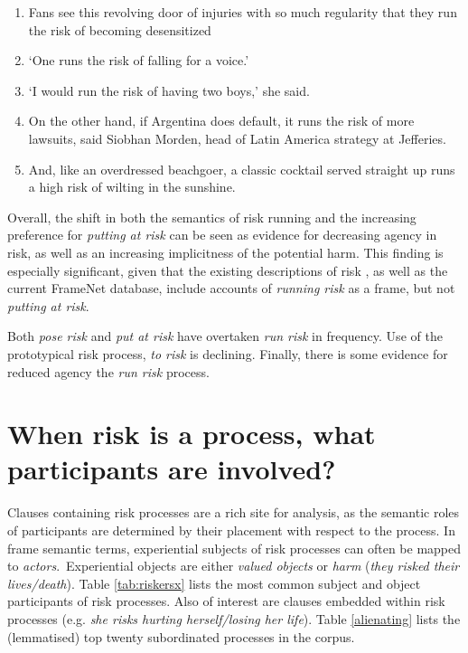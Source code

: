     \begin{enumerate} [before=\itshape,font=\normalfont]   \setlength\itemsep{0em} \small
    \item Fans see this revolving door of injuries with so much regularity that they run the risk of becoming desensitized 
    \item `One runs the risk of falling for a voice.'
    \item `I would run the risk of having two boys,' she said.
    \item On the other hand, if Argentina does default, it runs the risk of more lawsuits, said Siobhan Morden, head of Latin America strategy at Jefferies.
    \item And, like an overdressed beachgoer, a classic cocktail served straight up runs a high risk of wilting in the sunshine.
    \end{enumerate}
    Overall, the shift in both the semantics of risk running and the increasing preference for \emph{putting at risk} can be seen as evidence for decreasing agency in risk, as well as an increasing implicitness of the potential harm. This finding is especially significant, given that the existing descriptions of risk \cite{fillmore_toward_1992}, as well as the current FrameNet database, include accounts of \emph{running risk} as a frame, but not \emph{putting at risk}.

    \vspace{5mm}\noindent\begin{tcolorbox}[colback=yellow!5,colframe=yellow!40!black,title=Summary: types of risk processes]
    \parbox{1\textwidth}{%
    Both \emph{pose risk} and \emph{put at risk} have overtaken \emph{run risk} in frequency. Use of the prototypical risk process, \emph{to risk} is declining. Finally, there is some evidence for reduced agency the \emph{run risk} process.}
    \end{tcolorbox}
    \vspace{5mm}
    
\section{When risk is a process, what participants are involved?} \FloatBarrier
    
    Clauses containing risk processes are a rich site for analysis, as the semantic roles of participants are determined by their placement with respect to the process. In frame semantic terms, experiential subjects of risk processes can often be mapped to \emph{actors}.~Experiential objects are either \emph{valued objects} or \emph{harm} (\emph{they risked their lives/death}). Table \ref{tab:riskersx} lists the most common subject and object participants of risk processes. Also of interest are clauses embedded within risk processes (e.g. \emph{she risks hurting herself\slash losing her life}). Table \ref{alienating} lists the (lemmatised) top twenty subordinated processes in the corpus.

